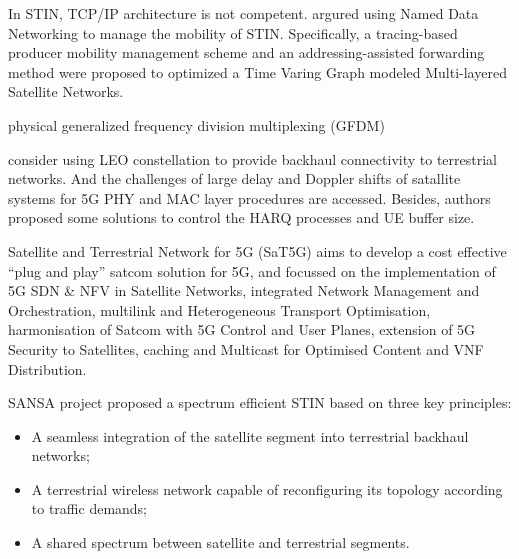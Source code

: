 \documentclass[12pt, draftclsnofoot, onecolumn]{IEEEtran}
\begin{document}
In STIN, TCP/IP architecture is not competent.
\cite{liu2018space} argured using Named Data Networking to manage the mobility of STIN. Specifically, a tracing-based producer mobility management scheme and an addressing-assisted forwarding method were proposed to optimized a Time Varing Graph modeled Multi-layered Satellite Networks. 

physical
generalized frequency division multiplexing (GFDM)
\cite{yang2018interference}\cite{yang2018data}


\cite{kodheli2017integration} consider using LEO constellation to provide backhaul connectivity to terrestrial networks. And the challenges of large delay and Doppler shifts of satallite systems for 5G PHY and MAC layer procedures are accessed. Besides, authors proposed some solutions to control the HARQ processes and UE buffer size.

































Satellite and Terrestrial Network for 5G (SaT5G)\cite{sat5g} aims to develop a cost effective “plug and play” satcom solution for 5G, and focussed on the implementation of 5G SDN \& NFV in Satellite Networks, integrated Network Management and Orchestration, multilink and Heterogeneous Transport Optimisation, harmonisation of Satcom with 5G Control and User Planes, extension of 5G Security to Satellites, caching and Multicast for Optimised Content and VNF Distribution.

SANSA project\cite{sansa} proposed a spectrum efficient STIN based on three key principles: 
\begin{itemize}
	\item A seamless integration of the satellite segment into terrestrial backhaul networks;
	\item A terrestrial wireless network capable of reconfiguring its topology according to traffic demands;
	\item A shared spectrum between satellite and terrestrial segments.
\end{itemize}
\end{document}
